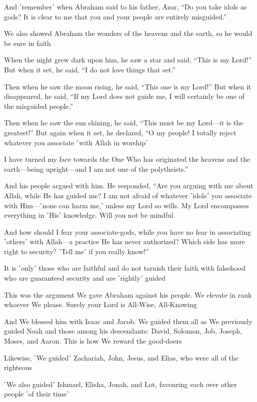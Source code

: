 And ˹remember˺ when Abraham said to his father, Ȃzar, “Do you take idols as gods? It is clear to me that you and your people are entirely misguided.”

We also showed Abraham the wonders of the heavens and the earth, so he would be sure in faith

When the night grew dark upon him, he saw a star and said, “This is my Lord!” But when it set, he said, “I do not love things that set.”

Then when he saw the moon rising, he said, “This one is my Lord!” But when it disappeared, he said, “If my Lord does not guide me, I will certainly be one of the misguided people.”

Then when he saw the sun shining, he said, “This must be my Lord—it is the greatest!” But again when it set, he declared, “O my people! I totally reject whatever you associate ˹with Allah in worship˺

I have turned my face towards the One Who has originated the heavens and the earth—being upright—and I am not one of the polytheists.”

And his people argued with him. He responded, “Are you arguing with me about Allah, while He has guided me? I am not afraid of whatever ˹idols˺ you associate with Him—˹none can harm me,˺ unless my Lord so wills. My Lord encompasses everything in ˹His˺ knowledge. Will you not be mindful

And how should I fear your associate-gods, while you have no fear in associating ˹others˺ with Allah—a practice He has never authorized? Which side has more right to security? ˹Tell me˺ if you really know!”

It is ˹only˺ those who are faithful and do not tarnish their faith with falsehood who are guaranteed security and are ˹rightly˺ guided

This was the argument We gave Abraham against his people. We elevate in rank whoever We please. Surely your Lord is All-Wise, All-Knowing

And We blessed him with Isaac and Jacob. We guided them all as We previously guided Noah and those among his descendants: David, Solomon, Job, Joseph, Moses, and Aaron. This is how We reward the good-doers

Likewise, ˹We guided˺ Zachariah, John, Jesus, and Elias, who were all of the righteous

˹We also guided˺ Ishmael, Elisha, Jonah, and Lot, favouring each over other people ˹of their time˺

